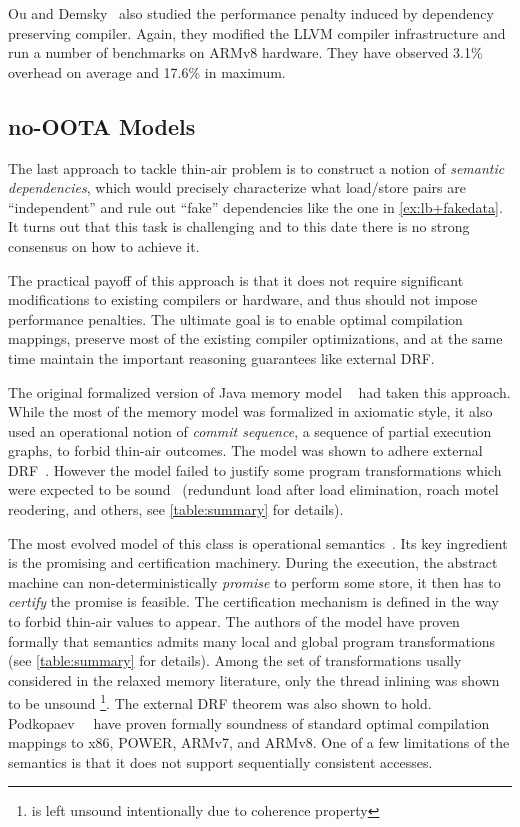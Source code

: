 Ou and Demsky~\cite{Ou-Demsky:OOPSLA18} also studied 
the performance penalty induced by dependency preserving compiler. 
Again, they modified the LLVM compiler infrastructure 
and run a number of benchmarks on ARMv8 hardware. 
They have observed 3.1\% overhead on average and 17.6\% in maximum. 

\subsection{no-OOTA Models}
\label{sec:prm-cert}

The last approach to tackle thin-air problem is to   
construct a notion of \emph{semantic dependencies}, 
which would precisely characterize what load/store 
pairs are ``independent'' and rule out 
``fake'' dependencies like the one in \ref{ex:lb+fakedata}.
It turns out that this task is challenging 
and to this date there is no strong consensus on how to achieve it.

The practical payoff of this approach is that it 
does not require significant modifications to existing compilers or hardware, 
and thus should not impose performance penalties.  
The ultimate goal is to enable optimal compilation mappings, 
preserve most of the existing compiler optimizations, 
and at the same time maintain the important 
reasoning guarantees like external DRF. 

The original formalized version of Java memory model \JMM~\cite{Manson-al:POPL05}
had taken this approach. While the most of the memory model 
was formalized in axiomatic style, it also used 
an operational notion of \emph{commit sequence}, 
\ie a sequence of partial execution graphs, to forbid thin-air outcomes. 
The model was shown to adhere external DRF~\cite{Huisman-Petri:CONCUR07}.
However the model failed to justify some program transformations 
which were expected to be sound~\cite{Sevcik-Aspinall:ECOOP08} 
(\eg redundunt load after load elimination, roach motel reodering, and others,
see \cref{table:summary} for details). 

The most evolved model of this class is 
\Promising operational semantics~\cite{Kang-al:POPL17, Lee-al:PLDI20}. 
Its key ingredient is the promising and certification machinery.
During the execution, the abstract machine can 
non-deterministically \emph{promise} to perform some store,
it then has to \emph{certify} the promise is feasible. 
The certification mechanism is defined in the way to forbid thin-air values to appear.
The authors of the model have proven formally 
that \Promising semantics admits many local and global program transformations
(see \cref{table:summary} for details).
Among the set of transformations usally considered 
in the relaxed memory literature, 
only the thread inlining was shown to be unsound%
\footnote{\CSE is left unsound intentionally due to coherence property}. 
The external DRF theorem was also shown to hold. 
Podkopaev~\etal~\cite{Podkopaev-al:ECOOP17, Podkopaev-al:POPL19} have proven formally
soundness of standard optimal compilation mappings to x86, POWER, ARMv7, and ARMv8.
One of a few limitations of the \Promising semantics is that 
it does not support sequentially consistent accesses. 

